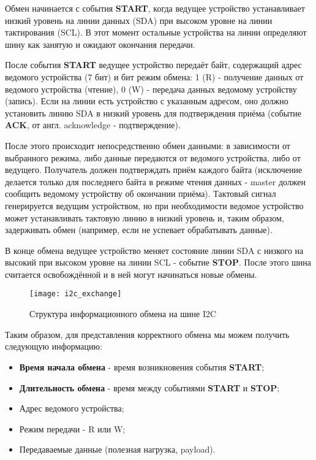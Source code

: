 Обмен начинается с события \textbf{START}, когда ведущее устройство устанавливает низкий уровень на линии данных (SDA) при высоком уровне на линии тактирования (SCL). В этот момент остальные устройства на линии определяют шину как занятую и ожидают окончания передачи.

После события \textbf{START} ведущее устройство передаёт байт, содержащий адрес ведомого устройства (7 бит) и бит режим обмена: 1 (R) - получение данных от ведомого устройства (чтение), 0 (W) - передача данных ведомому устройству (запись). Если на линии есть устройство с указанным адресом, оно должно установить линию SDA в низкий уровень для подтверждения приёма (событие \textbf{ACK}, от англ. acknowledge - подтверждение).

После этого происходит непосредственно обмен данными: в зависимости от выбранного режима, либо данные передаются от ведомого устройства, либо от ведущего. Получатель должен подтверждать приём каждого байта (исключение делается только для последнего байта в режиме чтения данных - master должен сообщить ведомому устройству об окончании приёма). Тактовый сигнал генерируется ведущим устройством, но при необходимости ведомое устройство может устанавливать тактовую линию в низкий уровень и, таким образом, задерживать обмен (например, если не успевает обрабатывать данные).

В конце обмена ведущее устройство меняет состояние линии SDA с низкого на высокий при высоком уровне на линии SCL - событие \textbf{STOP}. После этого шина считается освобождённой и в ней могут начинаться новые обмены.

\begin{figure}[H]
 \centering
 \texttt{[image: i2c\_exchange]}
 \caption{Структура информационного обмена на шине I2C}
 \label{fig:i2c_exchange}
\end{figure}

Таким образом, для представления корректного обмена мы можем получить следующую информацию:

\begin{itemize}
 \item \textbf{Время начала обмена} - время возникновения события \textbf{START};
 \item \textbf{Длительность обмена} - время между событиями \textbf{START} и \textbf{STOP};
 \item Адрес ведомого устройства;
 \item Режим передачи - R или W;
 \item Передаваемые данные (полезная нагрузка, payload).
\end{itemize}

